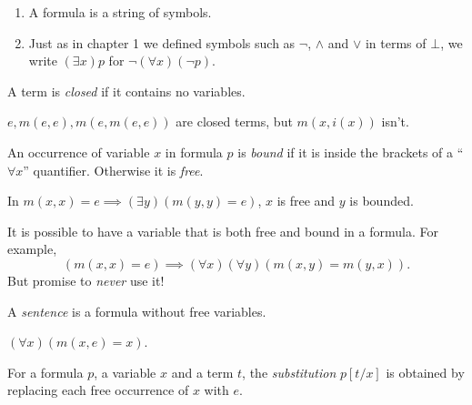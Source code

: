\documentclass[a4paper]{article}
\begin{document}
\begin{note}\leavevmode
  \begin{enumerate}
  \item A formula is a string of symbols.
  \item Just as in chapter 1 we defined symbols such as \(\neg\), \(\land\) and \(\lor\) in terms of \(\bot\), we write \((\exists x) p\) for \(\neg (\forall x) (\neg p)\).
  \end{enumerate}
\end{note}

\begin{definition}[Closed]
  A term is \emph{closed} if it contains no variables.
\end{definition}

\begin{eg}
  \(e, m(e, e), m(e, m(e, e))\) are closed terms, but \(m(x, i(x))\) isn't.
\end{eg}

\begin{definition}
  An occurrence of variable \(x\) in formula \(p\) is \emph{bound} if it is inside the brackets of a ``\(\forall x\)'' quantifier. Otherwise it is \emph{free}.
\end{definition}

\begin{eg}
  In \(m(x, x) = e \implies (\exists y) (m(y, y) = e)\), \(x\) is free and \(y\) is bounded.
\end{eg}

\begin{note}
  It is possible to have a variable that is both free and bound in a formula. For example,
  \[
    (m(x, x) = e) \implies (\forall x)(\forall y) (m(x, y) = m(y, x)).
  \]
  But promise to \emph{never} use it!
\end{note}

\begin{definition}[Sentence]
  A \emph{sentence} is a formula without free variables.
\end{definition}

\begin{eg}
  \((\forall x) (m(x, e) = x)\).
\end{eg}

\begin{definition}[Substitution]
  For a formula \(p\), a variable \(x\) and a term \(t\), the \emph{substitution} \(p[t/x]\) is obtained by replacing each free occurrence of \(x\) with \(e\).
\end{definition}
\end{document}
